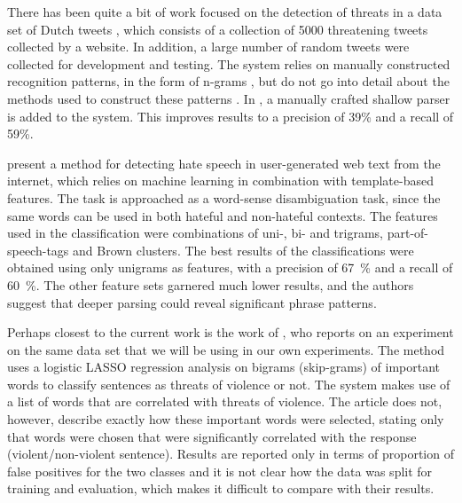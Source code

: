 \documentclass[11pt,letterpaper]{article}
\newcommand{\tovs}{threats of violence}
\begin{document}
There has been quite a bit of work focused on the detection of threats
in a data set of Dutch tweets \cite{nellngram2013,nellshallow2013}, which consists of a collection of 5000
threatening tweets collected by a website. In addition, a large number of random tweets were collected for
development and testing. %
The system relies on manually constructed recognition patterns, in the
form of n-grams 
, but do not go into detail about the methods used to
construct these patterns%
. In
, a manually crafted shallow parser is added
to the system. This improves results to a precision of 39\% and a
recall of 59\%.

 present a method for detecting hate speech in
user-generated web text from the internet, which relies on machine
learning in combination with template-based features. The task
is approached as a word-sense disambiguation task, since the same
words can be used in both hateful and non-hateful contexts. The
features used in the classification were combinations of uni-, bi- and
trigrams, part-of-speech-tags and Brown clusters.  The best results of
the classifications were obtained using only unigrams as features,
with a precision of 67~\% and a recall of 60~\%. The other feature
sets garnered much lower results, and the authors suggest that deeper
parsing could reveal significant phrase patterns.

Perhaps closest to the current work is the work of
, who reports on an experiment on the same data set that
we will be using in our own experiments. The method uses a logistic
LASSO regression analysis on bigrams (skip-grams) of important words
to classify sentences as \tovs{} or not.  The system makes use of a
list of words that are correlated with threats of violence. The
article does not, however, describe exactly how these important words
were selected, stating only that words were chosen that were
significantly correlated with the response (violent/non-violent
sentence). Results are reported only in terms of proportion of false
positives for the two classes and it is not clear how the data was
split for training and evaluation, which makes it difficult to compare with their results.
\end{document}
